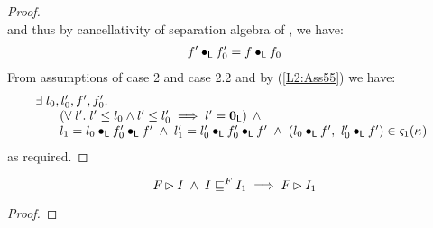 \begin{lemma}[]
\begin{proof}
\begin{equation}
\end{equation}
% 
and thus by cancellativity of separation algebra of \LState, we have:
%
\begin{align}
	f' \bullet_{\textsf{L}} f'_0 = f \bullet_{\textsf{L}} f_0 \label{L2:Ass55}
\end{align}
%
From assumptions of case 2 and case 2.2 and by (\ref{L2:Ass55}) we have:
%
\begin{align}
\begin{array}{l}
	\exists\; l_0, l'_0, f', f'_0.\; \\
  \hspace*{0.5cm}
  \begin{array}{l}
  	\left(\forall\; l'.\; l' \leq l_0 \land l' \leq l'_0 \implies l' = \mathbf{0}_{\textsf{L}}\right)\;\land\\
  	l_1 = l_0 \bullet_{\textsf{L}} f'_0 \bullet_{\textsf{L}} f' \;\land\; l'_1 = l'_0 \bullet_{\textsf{L}} f'_0 \bullet_{\textsf{L}} f' \;\land\;
  	(l_0 \bullet_{\textsf{L}} f',\ l'_0 \bullet_{\textsf{L}} f') \in \varsigma_{1}(\kappa_{}) 
  \end{array} 
\end{array} \label{L2:Case2.2}
\end{align}
%
as required.
\end{proof}
\end{lemma}
%
%
\begin{lemma}[]
%
\[
		F_{} \rhd I \;\land\; I \sqsubseteq^{F_{}} I_1 \implies F_{} \rhd I_1
\]
%
\begin{proof}
\todo
\end{proof}
\end{lemma}
%
%
